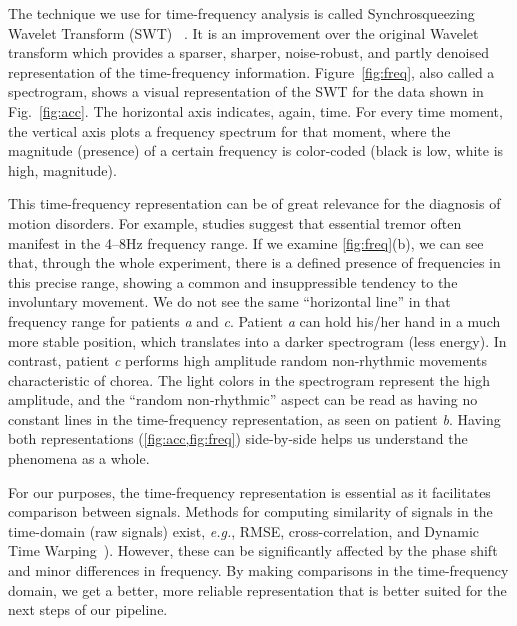 The technique we use for time-frequency analysis is called Synchrosqueezing Wavelet Transform (SWT)~ \citep{MIHALEC2016324}. It is an improvement over the original Wavelet transform \citep{wavelet} which provides a sparser, sharper, noise-robust, and partly denoised representation of the time-frequency information. Figure~\ref{fig:freq}, also called a spectrogram, shows a visual representation of the SWT for the data shown in Fig.~\ref{fig:acc}. The horizontal axis indicates, again, time. For every time moment, the vertical axis plots a frequency spectrum for that moment, where the magnitude (presence) of a certain frequency is color-coded (black is low, white is high, magnitude).

This time-frequency representation can be of great relevance for the diagnosis of motion disorders. For example, studies suggest \citep{tremor_freq} that essential tremor often manifest in the 4--8Hz frequency range. If we examine \cref{fig:freq}(b), we can see that,  through the whole experiment, there is a defined presence of frequencies in this precise range, showing a common and insuppressible tendency to the involuntary movement. We do not see the same ``horizontal line'' in that frequency range for patients \textit{a} and \textit{c}. Patient \textit{a} can hold his/her hand in a much more stable position, which translates into a darker spectrogram (less energy). In contrast, patient \textit{c} performs high amplitude random non-rhythmic movements characteristic of chorea. The light colors in the spectrogram represent the high amplitude, and the ``random non-rhythmic'' aspect can be read as having no constant lines in the time-frequency representation, as seen on patient \textit{b}. Having both representations (\cref{fig:acc,fig:freq}) side-by-side helps us understand the phenomena as a whole. 

For our purposes, the time-frequency representation is essential as it facilitates comparison between signals. Methods for computing similarity of signals in the time-domain (raw signals) exist, \emph{e.g.}, RMSE, cross-correlation, and Dynamic Time Warping~\citep{Gupta1996}). However, these can be significantly affected by the phase shift and minor differences in frequency. By making comparisons in the time-frequency domain, we get a better, more reliable representation that is better suited for the next steps of our pipeline.

